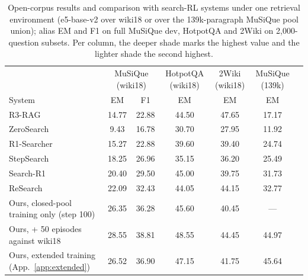 \begin{table}[t]
\centering
\small
\begin{tabular}{lcccccc}
\toprule
 & \multicolumn{2}{c}{MuSiQue (wiki18)} & HotpotQA (wiki18) & 2Wiki (wiki18) & MuSiQue (139k) \\
System & EM & F1 & EM & EM & EM \\
\midrule
R3-RAG       & 14.77 & 22.88 & 44.50 & \cellcolor{best}47.65 & 17.17 \\
ZeroSearch   & 9.43  & 16.78 & 30.70 & 27.95 & 11.92 \\
R1-Searcher  & 15.27 & 22.88 & 39.60 & 39.40 & 24.74 \\
StepSearch   & 18.25 & 26.96 & 35.15 & 36.20 & 25.49 \\
Search-R1    & 20.40 & 29.50 & 45.00 & 39.75 & 31.73 \\
ReSearch     & 22.09 & 32.43 & 44.05 & 44.15 & 32.77 \\
\midrule
Ours, closed-pool training only (step 100) & 26.35 & 36.28 & 45.60 & 40.45 & --- \\
Ours, + 50 episodes against wiki18 & \cellcolor{best}28.55 & \cellcolor{best}38.81 & \cellcolor{best}48.55 & \cellcolor{second}44.45 & \cellcolor{second}44.97 \\
Ours, extended training (App.~\ref{app:extended}) & \cellcolor{second}26.52 & \cellcolor{second}36.90 & \cellcolor{second}47.15 & 41.75 & \cellcolor{best}45.64 \\
\bottomrule
\end{tabular}
\caption{Open-corpus results and comparison with search-RL systems under one retrieval
environment (e5-base-v2 over wiki18 or over the 139k-paragraph MuSiQue
pool union); alias EM and F1 on full MuSiQue dev, HotpotQA and 2Wiki on
2{,}000-question subsets. Per column, the deeper shade marks the
highest value and the lighter shade the second highest.}
\label{tab:external}
\end{table}

